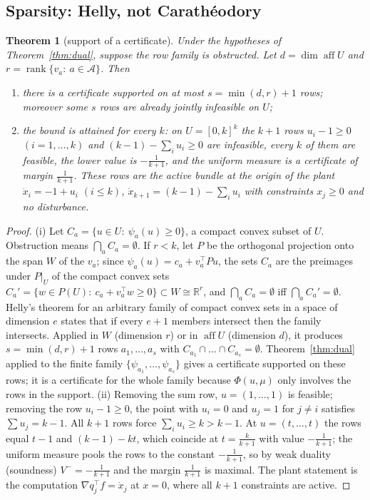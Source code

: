 \documentclass[11pt,a4paper]{article}
\theoremstyle{plain}
\newtheorem{theorem}{Theorem}[section]
\theoremstyle{definition}
\theoremstyle{remark}
\newcommand{\R}{\mathbb{R}}
\newcommand{\calA}{\mathcal{A}}
\newcommand{\aff}{\operatorname{aff}}
\newcommand{\rank}{\operatorname{rank}}
\newcommand{\tfr}[2]{\tfrac{#1}{#2}}
\begin{document}
\subsection{Sparsity: Helly, not Carath\'eodory}

\begin{theorem}[support of a certificate]\label{thm:helly}
Under the hypotheses of Theorem~\ref{thm:dual}, suppose the row family is obstructed. Let $d=\dim\aff U$ and $r=\rank\{v_a:\ a\in\calA\}$. Then
\begin{enumerate}[leftmargin=1.6em,itemsep=1pt]
\item[(i)] there is a certificate supported on at most $s=\min(d,r)+1$ rows; moreover some $s$ rows are already jointly infeasible on $U$;
\item[(ii)] the bound is attained for every $k$: on $U=[0,k]^k$ the $k+1$ rows $u_i-1\ge0$ $(i=1,\dots,k)$ and $(k-1)-\sum_iu_i\ge0$ are infeasible, every $k$ of them are feasible, the lower value is $-\tfr1{k+1}$, and the uniform measure is a certificate of margin $\tfr1{k+1}$. These rows are the active bundle at the origin of the plant $\dot x_i=-1+u_i$ $(i\le k)$, $\dot x_{k+1}=(k-1)-\sum_iu_i$ with constraints $x_j\ge0$ and no disturbance.
\end{enumerate}
\end{theorem}

\begin{proof}
(i) Let $C_a=\{u\in U:\ \psi_a(u)\ge0\}$, a compact convex subset of $U$. Obstruction means $\bigcap_aC_a=\emptyset$. If $r<k$, let $P$ be the orthogonal projection onto the span $W$ of the $v_a$; since $\psi_a(u)=c_a+v_a^\top Pu$, the sets $C_a$ are the preimages under $P|_U$ of the compact convex sets $C_a'=\{w\in P(U):\ c_a+v_a^\top w\ge0\}\subset W\cong\R^r$, and $\bigcap_aC_a=\emptyset$ iff $\bigcap_aC_a'=\emptyset$. Helly's theorem for an arbitrary family of compact convex sets in a space of dimension $e$ \cite{Helly1923,Rockafellar1970} states that if every $e+1$ members intersect then the family intersects. Applied in $W$ (dimension $r$) or in $\aff U$ (dimension $d$), it produces $s=\min(d,r)+1$ rows $a_1,\dots,a_s$ with $C_{a_1}\cap\dots\cap C_{a_s}=\emptyset$. Theorem~\ref{thm:dual} applied to the finite family $\{\psi_{a_1},\dots,\psi_{a_s}\}$ gives a certificate supported on these rows; it is a certificate for the whole family because $\Phi(u,\mu)$ only involves the rows in the support. (ii) Removing the sum row, $u=(1,\dots,1)$ is feasible; removing the row $u_i-1\ge0$, the point with $u_i=0$ and $u_j=1$ for $j\ne i$ satisfies $\sum u_j=k-1$. All $k+1$ rows force $\sum_iu_i\ge k>k-1$. At $u=(t,\dots,t)$ the rows equal $t-1$ and $(k-1)-kt$, which coincide at $t=\tfr{k}{k+1}$ with value $-\tfr1{k+1}$; the uniform measure pools the rows to the constant $-\tfr1{k+1}$, so by weak duality (soundness) $V^-=-\tfr1{k+1}$ and the margin $\tfr1{k+1}$ is maximal. The plant statement is the computation $\nabla q_j^\top f=\dot x_j$ at $x=0$, where all $k+1$ constraints are active.
\end{proof}
\end{document}
